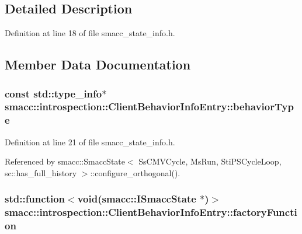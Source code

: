 \subsection{Detailed Description}


Definition at line 18 of file smacc\+\_\+state\+\_\+info.\+h.



\subsection{Member Data Documentation}
\subsubsection[{\texorpdfstring{behavior\+Type}{behaviorType}}]{\setlength{\rightskip}{0pt plus 5cm}const std\+::type\+\_\+info$\ast$ smacc\+::introspection\+::\+Client\+Behavior\+Info\+Entry\+::behavior\+Type}\hypertarget{structsmacc_1_1introspection_1_1ClientBehaviorInfoEntry_a11156213a771b7801ae69698de326e44}{}\label{structsmacc_1_1introspection_1_1ClientBehaviorInfoEntry_a11156213a771b7801ae69698de326e44}


Definition at line 21 of file smacc\+\_\+state\+\_\+info.\+h.



Referenced by smacc\+::\+Smacc\+State$<$ Ss\+C\+M\+V\+Cycle, Ms\+Run, Sti\+P\+S\+Cycle\+Loop, sc\+::has\+\_\+full\+\_\+history $>$\+::configure\+\_\+orthogonal().

\subsubsection[{\texorpdfstring{factory\+Function}{factoryFunction}}]{\setlength{\rightskip}{0pt plus 5cm}std\+::function$<$void({\bf smacc\+::\+I\+Smacc\+State} $\ast$)$>$ smacc\+::introspection\+::\+Client\+Behavior\+Info\+Entry\+::factory\+Function}\hypertarget{structsmacc_1_1introspection_1_1ClientBehaviorInfoEntry_abb0863623802e0107c659e61931518f4}{}\label{structsmacc_1_1introspection_1_1ClientBehaviorInfoEntry_abb0863623802e0107c659e61931518f4}


